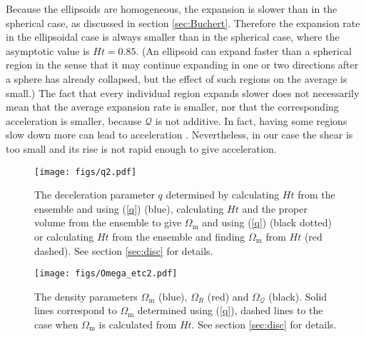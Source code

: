 \documentclass[11pt, a4paper]{article}
\newcommand{\re}[1]{(\ref{#1})}
\renewcommand{\sec}[1]{section \ref{#1}}
\newcommand{\sQ}{\mathcal{Q}}
\newcommand{\Om}{\Omega_{\mathrm{m}}}
\newcommand{\OQ}{\Omega_{\sQ}}
\newcommand{\OR}{\Omega_{R}}
\begin{document}
Because the ellipsoids are homogeneous, the expansion is slower than
in the spherical case, as discussed in \sec{sec:Buchert}. Therefore
the expansion rate in the ellipsoidal case is always smaller than in
the spherical case, where the asymptotic value is $Ht=0.85$. (An
ellipsoid can expand faster than a spherical region in the sense that
it may continue expanding in one or two directions after a sphere has
already collapsed, but the effect of such regions on the average is
small.) The fact that every individual region expands slower does not
necessarily mean that the average expansion rate is smaller, nor that
the corresponding acceleration is smaller, because $\sQ$ is not
additive. In fact, having some regions slow down more can lead to
acceleration \cite{Kai:2006ws, Rasanen:2006zw, Rasanen:2006kp,
  Boehm:2013qqa}. Nevertheless, in our case the shear is too small and
its rise is not rapid enough to give acceleration.

\begin{figure}[t]
  \centering
  \texttt{[image: figs/q2.pdf]} \\
  \caption{The deceleration parameter $q$ determined by calculating
    $Ht$ from the ensemble and using \re{q} (blue), calculating $Ht$
    and the proper volume from the ensemble to give $\Om$ and using
    \re{q} (black dotted) or calculating $Ht$ from the ensemble and
    finding $\Om$ from $Ht$ (red dashed). See \sec{sec:disc} for
    details.}
  \label{fig:q}
\end{figure}

\begin{figure}[t]
  \centering
  \texttt{[image: figs/Omega\_etc2.pdf]} \\
  \caption{The density parameters $\Om$ (blue), $\OR$ (red) and $\OQ$
    (black). Solid lines correspond to $\Om$ determined using \re{q},
    dashed lines to the case when $\Om$ is calculated from $Ht$. See
    \sec{sec:disc} for details.}
  \label{fig:omegas2}
\end{figure}
\end{document}
